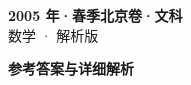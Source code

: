 \documentclass[zihao=-4, a4paper]{ctexart}
\begin{document}
\begin{center}
  {\Large\bfseries 2005 年·春季北京卷·文科}\\[4pt]
  {\large 数学 · 解析版}
\end{center}
\medskip
{}

\clearpage
{}
\begin{center}{\Large\bfseries 参考答案与详细解析}\end{center}
\medskip

\end{document}
